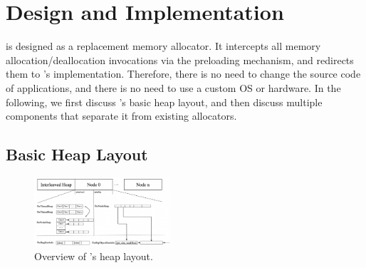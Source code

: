 \section{Design and Implementation}
\label{sec:implement}

\NM{} is designed as a replacement memory allocator. It intercepts all memory allocation/deallocation invocations via the preloading mechanism, and redirects them to \NM{}'s implementation. Therefore, there is no need to change the source code of applications, and there is no need to use a custom OS or hardware. In the following, we first discuss \NM{}'s basic heap layout, and then discuss multiple components that separate it from existing allocators.

\subsection{Basic Heap Layout}
\label{sec:overview}

\begin{figure}[!ht]
\begin{center}
\includegraphics[width=0.45\textwidth]{SC2022/figure/numalloc-overview.png}
\end{center}
\caption{Overview of \NA{}'s heap layout.
\label{fig:overview}}
\end{figure}


